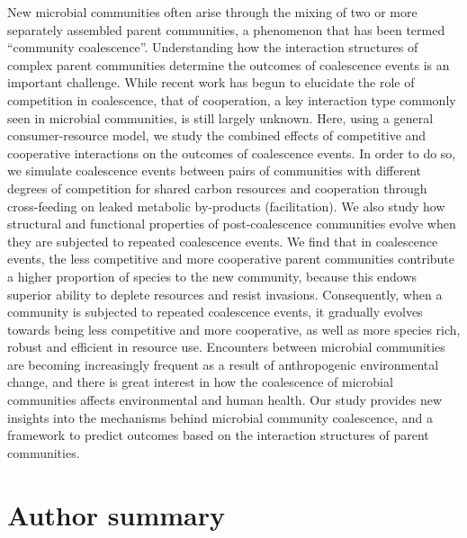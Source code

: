 \documentclass[10pt,letterpaper]{article}
\begin{document}
New microbial communities often arise through the mixing of two or more separately assembled parent communities, a phenomenon that has been termed ``community coalescence''. Understanding how the interaction structures of complex parent communities determine the outcomes of coalescence events is an important challenge. While recent work has begun to elucidate the role of competition in coalescence, that of cooperation, a key interaction type commonly seen in microbial communities, is still largely unknown. Here, using a general consumer-resource model, we study the combined effects of competitive and cooperative interactions on the outcomes of coalescence events. In order to do so, we simulate coalescence events between pairs of communities with different degrees of competition for shared carbon resources and cooperation through cross-feeding on leaked metabolic by-products (facilitation). We also study how structural and functional properties of post-coalescence communities evolve when they are subjected to repeated coalescence events. We find that in coalescence events, the less competitive and more cooperative parent communities contribute a higher proportion of species to the new community, because this endows superior ability to deplete resources and resist invasions. Consequently, when a community is subjected to repeated coalescence events, it gradually evolves towards being less competitive and more cooperative, as well as more species rich, robust and efficient in resource use. Encounters between microbial communities are becoming increasingly frequent as a result of anthropogenic environmental change, and there is great interest in how the coalescence of microbial communities affects environmental and human health. Our study provides new insights into the mechanisms behind microbial community coalescence, and a framework to predict outcomes based on the interaction structures of parent communities.

\section*{Author summary}
\end{document}
